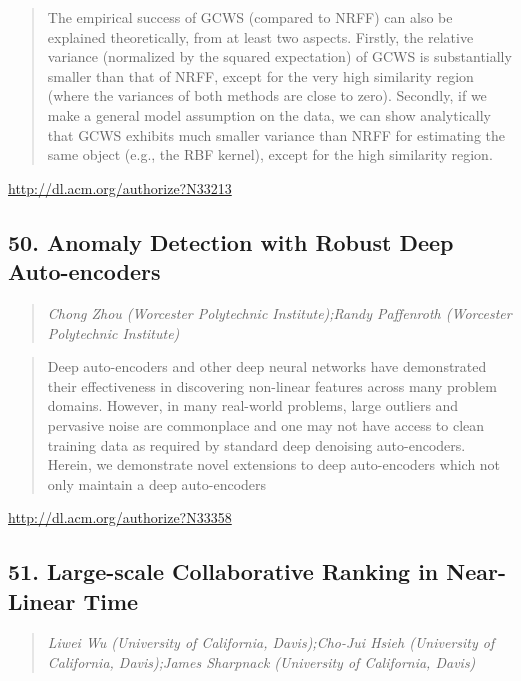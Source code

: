 \documentclass{article}
\begin{document}
\begin{quote}
 The empirical success of GCWS (compared to NRFF) can also be explained theoretically, from at least two aspects. Firstly, the relative variance (normalized by the squared expectation) of GCWS is substantially smaller than that of NRFF, except for the very high similarity region (where the variances of both methods are close to zero). Secondly, if we make a general model assumption on the data, we can show analytically that GCWS exhibits much smaller variance than NRFF for estimating the same object (e.g., the RBF kernel), except for the high similarity region.
\end{quote}

\href{http://dl.acm.org/authorize?N33213}{http://dl.acm.org/authorize?N33213}

\subsection{50. Anomaly Detection with Robust Deep Auto-encoders}

\begin{quote}
\footnotesize{\textit{Chong Zhou (Worcester Polytechnic Institute);Randy Paffenroth (Worcester Polytechnic Institute)}}

\end{quote}

\begin{quote}
Deep auto-encoders and other deep neural networks have demonstrated their effectiveness in discovering non-linear features across many problem domains. However, in many real-world problems, large outliers and pervasive noise are commonplace and one may not have access to clean training data as required by standard deep denoising auto-encoders. Herein, we demonstrate novel extensions to deep auto-encoders which not only maintain a deep auto-encoders
\end{quote}

\href{http://dl.acm.org/authorize?N33358}{http://dl.acm.org/authorize?N33358}

\subsection{51. Large-scale Collaborative Ranking in Near-Linear Time}

\begin{quote}
\footnotesize{\textit{Liwei Wu (University of California, Davis);Cho-Jui Hsieh (University of California, Davis);James Sharpnack (University of California, Davis)}}

\end{quote}
\end{document}
